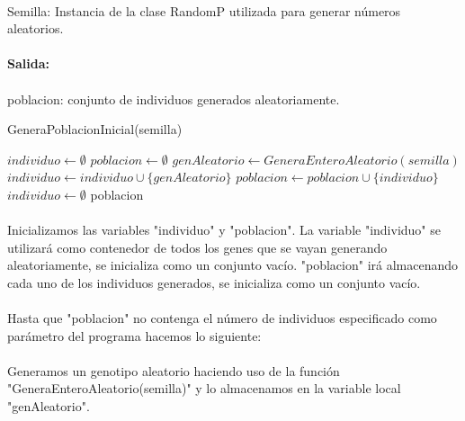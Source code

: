 	\paragraph{}Semilla: Instancia de la clase RandomP utilizada para generar números aleatorios.
	
	\paragraph{Salida:}
	
	\paragraph{}poblacion: conjunto de individuos generados aleatoriamente.
	\begin{algorithm}[H]
		\caption{GeneraPoblacionInicial(semilla)}
		\begin{algorithmic}
			\STATE $individuo \leftarrow \emptyset$
			\STATE $poblacion \leftarrow \emptyset$
					\STATE $genAleatorio \leftarrow GeneraEnteroAleatorio(semilla)$
						\STATE $individuo \leftarrow individuo\cup\{genAleatorio\}$
					\ENDIF
				\ENDWHILE
				\STATE $poblacion \leftarrow poblacion\cup\{individuo\}$
				\STATE $individuo \leftarrow \emptyset$
				\ENDWHILE
			\RETURN poblacion
		\end{algorithmic}
	\end{algorithm}

	\paragraph{}Inicializamos las variables "individuo" y "poblacion". La variable "individuo" se utilizará como contenedor de todos los genes que se vayan generando aleatoriamente, se inicializa como un conjunto vacío. "poblacion" irá almacenando cada uno de los individuos generados, se inicializa como un conjunto vacío.
	
	\paragraph{}Hasta que "poblacion" no contenga el número de individuos especificado como parámetro del programa hacemos lo siguiente:
	
	\paragraph{}Generamos un genotipo aleatorio haciendo uso de la función "GeneraEnteroAleatorio(semilla)" y lo almacenamos en la variable local "genAleatorio".
	
